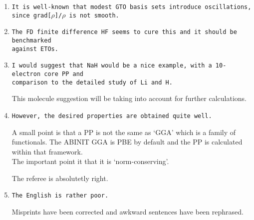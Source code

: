 \documentclass[10pt]{article}
\begin{document}
\begin{enumerate}
 

 \item {\tt It is well-known that modest GTO basis sets introduce 
 oscillations, since grad[$\rho$]/$\rho$ is not smooth.}
 
 \item {\tt The FD finite difference HF seems to cure this and it should 
 be benchmarked \\ against ETOs.}

  \item {\tt I would suggest that NaH would be a nice example, with 
  a 10-electron core PP and \\ comparison to the detailed study of Li 
  and H.}
  
  This molecule suggestion will be taking into account for further 
  calculations.

 \item {\tt However, the desired properties are obtained quite well.
 
 A small point is that a PP is not the same as ‘GGA’ which is 
 a family of  functionals. The ABINIT GGA is PBE by default and the PP 
 is calculated within that framework. \\ The important point it that it 
 is ‘norm-conserving’.}
 
 The referee is absolutetly right. 
 
 \item {\tt The English is rather poor.} 
 
 Misprints have been corrected and awkward sentences have been rephrased.
 
 
\end{enumerate}

 
\end{document}
